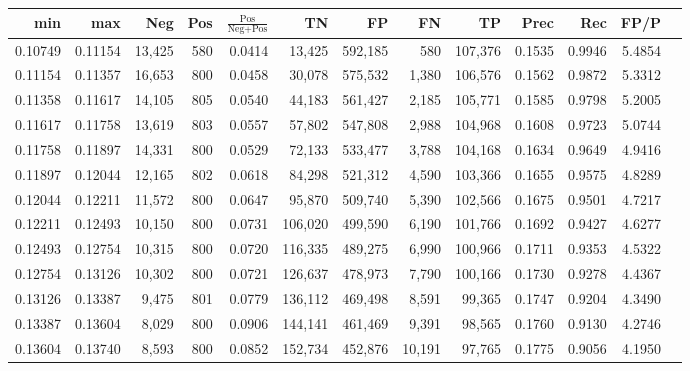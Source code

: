 \begin{tabular}{rrrrrrrrrrrrr}
\toprule
    min &     max &    Neg & Pos & $\frac{\text{Pos}}{\text{Neg}+\text{Pos}}$ &      TN &      FP &      FN &      TP &   Prec &    Rec &   FP/P \\
\midrule
0.10749 & 0.11154 & 13,425 & 580 &                                     0.0414 &  13,425 & 592,185 &     580 & 107,376 & 0.1535 & 0.9946 & 5.4854 \\
0.11154 & 0.11357 & 16,653 & 800 &                                     0.0458 &  30,078 & 575,532 &   1,380 & 106,576 & 0.1562 & 0.9872 & 5.3312 \\
0.11358 & 0.11617 & 14,105 & 805 &                                     0.0540 &  44,183 & 561,427 &   2,185 & 105,771 & 0.1585 & 0.9798 & 5.2005 \\
0.11617 & 0.11758 & 13,619 & 803 &                                     0.0557 &  57,802 & 547,808 &   2,988 & 104,968 & 0.1608 & 0.9723 & 5.0744 \\
0.11758 & 0.11897 & 14,331 & 800 &                                     0.0529 &  72,133 & 533,477 &   3,788 & 104,168 & 0.1634 & 0.9649 & 4.9416 \\
0.11897 & 0.12044 & 12,165 & 802 &                                     0.0618 &  84,298 & 521,312 &   4,590 & 103,366 & 0.1655 & 0.9575 & 4.8289 \\
0.12044 & 0.12211 & 11,572 & 800 &                                     0.0647 &  95,870 & 509,740 &   5,390 & 102,566 & 0.1675 & 0.9501 & 4.7217 \\
0.12211 & 0.12493 & 10,150 & 800 &                                     0.0731 & 106,020 & 499,590 &   6,190 & 101,766 & 0.1692 & 0.9427 & 4.6277 \\
0.12493 & 0.12754 & 10,315 & 800 &                                     0.0720 & 116,335 & 489,275 &   6,990 & 100,966 & 0.1711 & 0.9353 & 4.5322 \\
0.12754 & 0.13126 & 10,302 & 800 &                                     0.0721 & 126,637 & 478,973 &   7,790 & 100,166 & 0.1730 & 0.9278 & 4.4367 \\
0.13126 & 0.13387 &  9,475 & 801 &                                     0.0779 & 136,112 & 469,498 &   8,591 &  99,365 & 0.1747 & 0.9204 & 4.3490 \\
0.13387 & 0.13604 &  8,029 & 800 &                                     0.0906 & 144,141 & 461,469 &   9,391 &  98,565 & 0.1760 & 0.9130 & 4.2746 \\
0.13604 & 0.13740 &  8,593 & 800 &                                     0.0852 & 152,734 & 452,876 &  10,191 &  97,765 & 0.1775 & 0.9056 & 4.1950 \\

\end{tabular}
